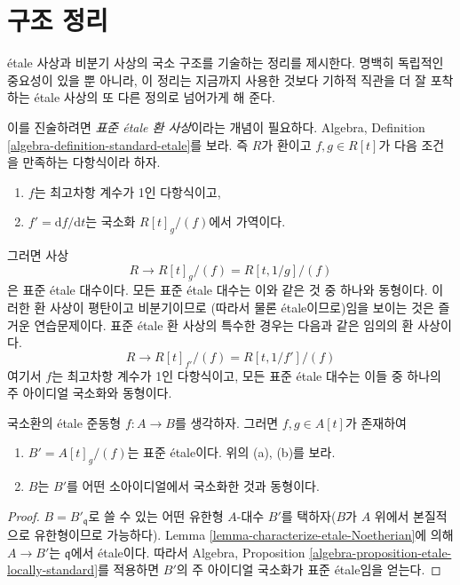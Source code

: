\section{구조 정리}
\label{section-structure-etale-map}

\noindent
\'etale 사상과 비분기 사상의 국소 구조를 기술하는 정리를 제시한다.
명백히 독립적인 중요성이 있을 뿐 아니라, 이 정리는 지금까지
사용한 것보다 기하적 직관을 더 잘 포착하는 \'etale 사상의 또 다른
정의로 넘어가게 해 준다.

\medskip\noindent
이를 진술하려면 {\it 표준 \'etale 환 사상}이라는 개념이 필요하다.
Algebra, Definition \ref{algebra-definition-standard-etale}를 보라.
즉 $R$가 환이고 $f, g \in R[t]$가 다음 조건을 만족하는 다항식이라 하자.
\begin{enumerate}
\item[(a)] $f$는 최고차항 계수가 1인 다항식이고,
\item[(b)] $f' = \text{d}f/\text{d}t$는 국소화
$R[t]_g/(f)$에서 가역이다.
\end{enumerate}
그러면 사상
$$
R \longrightarrow R[t]_g/(f) = R[t, 1/g]/(f)
$$
은 표준 \'etale 대수이다. 모든 표준 \'etale 대수는 이와 같은 것 중
하나와 동형이다. 이러한 환 사상이 평탄이고 비분기이므로
(따라서 물론 \'etale이므로)임을 보이는 것은 즐거운 연습문제이다.
표준 \'etale 환 사상의 특수한 경우는 다음과 같은 임의의 환 사상이다.
$$
R \longrightarrow R[t]_{f'}/(f) = R[t, 1/f']/(f)
$$
여기서 $f$는 최고차항 계수가 1인 다항식이고, 모든 표준 \'etale
대수는 이들 중 하나의 주 아이디얼 국소화와 동형이다.

\begin{theorem}
\label{theorem-structure-etale}
국소환의 \'etale 준동형 $f : A \to B$를 생각하자.
그러면 $f, g \in A[t]$가 존재하여
\begin{enumerate}
\item $B' = A[t]_g/(f)$는 표준 \'etale이다. 위의 (a), (b)를 보라.
\item $B$는 $B'$를 어떤 소아이디얼에서 국소화한 것과 동형이다.
\end{enumerate}
\end{theorem}

\begin{proof}
$B = B'_{\mathfrak q}$로 쓸 수 있는 어떤 유한형 $A$-대수 $B'$를
택하자($B$가 $A$ 위에서 본질적으로 유한형이므로 가능하다).
Lemma \ref{lemma-characterize-etale-Noetherian}에 의해
$A \to B'$는 $\mathfrak q$에서 \'etale이다.
따라서 Algebra, Proposition
\ref{algebra-proposition-etale-locally-standard}를 적용하면
$B'$의 주 아이디얼 국소화가 표준 \'etale임을 얻는다.
\end{proof}

